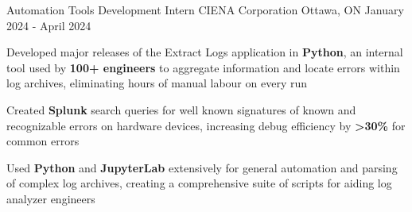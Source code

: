 

\begin{cventries}




	\cventry
	{Automation Tools Development Intern} %
	{CIENA Corporation} %
	{Ottawa, ON} %
	{January 2024 - April 2024} %
	{
		\begin{cvitems} %
      \item {Developed major releases of the Extract Logs application in \textbf{Python}, an internal tool used by \textbf{100+ engineers} to aggregate information and locate errors within log archives, eliminating hours of manual labour on every run}
			\item {Created \textbf{Splunk} search queries for well known signatures of known and recognizable errors on hardware devices, increasing debug efficiency by \textbf{>30\%} for common errors}
			\item {Used \textbf{Python} and \textbf{JupyterLab} extensively for general automation and parsing of complex log archives, creating a comprehensive suite of scripts for aiding log analyzer engineers}
		\end{cvitems}
	}


\end{cventries}
